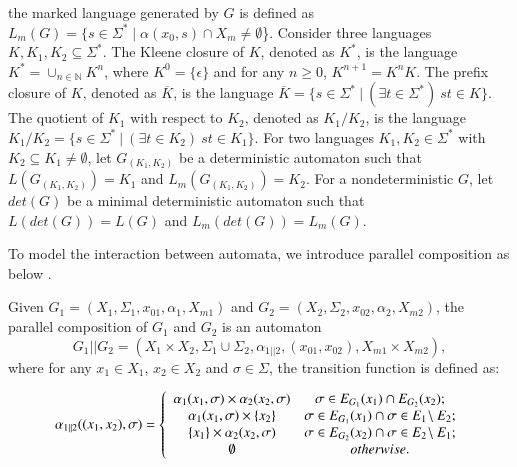 \documentclass[preprint,authoryear,12pt]{elsarticle}
\begin{document}
the marked language generated by $G$ is defined as $L_{m}(G)=\{s
\in \Sigma^{*} \mid \alpha(x_0, s) \cap X_m \neq \emptyset$\}.
Consider three languages $K, K_1, K_2 \subseteq \Sigma^{*}$. The
Kleene closure of $K$, denoted as $K^{*}$, is the language
$K^*=\cup_{n \in \mathbb{N}}K^{n}$, where $K^{0}=\{\epsilon\}$ and
for any $n \geq 0$, $K^{n+1}=K^{n}K$. The prefix closure of $K$,
denoted as $\overline{K}$, is the language $\overline{K}=\{s \in
\Sigma^{*}~|~(\exists t \in \Sigma^{*})~st\in K\}$. The quotient
of $K_1$ with respect to $K_2$, denoted as $K_1/K_2$, is the
language $K_1/K_2=\{s \in \Sigma^{*}~|~(\exists t \in K_2)~st \in
K_1\}$. For two languages $K_1, K_2 \in \Sigma^{*}$ with $K_2
\subseteq K_1 \neq \emptyset$, let $G_{(K_1, K_2)}$ be a
deterministic automaton such that $L(G_{(K_1, K_2)})=K_1$ and
$L_{m}(G_{(K_1, K_2)})=K_2$. For a nondeterministic $G$, let
$det(G)$ be a minimal deterministic automaton such that
$L(det(G))=L(G)$ and $L_{m}(det(G))=L_{m}(G)$.

To model the interaction between automata, we introduce parallel
composition as below \citep{cassandras2008introduction}.













\begin{Definition}\label{parallel}
Given $G_1 =(X_1,\Sigma_1,x_{01},\alpha_1, X_{m1})$ and $G_2
=(X_2,\Sigma_2,x_{02},\alpha_2,X_{m2})$, the parallel composition
of $G_1$ and $G_2$ is an automaton
\[
G_1 || G_2 = ( X_1 \times X_2, \Sigma_1 \cup \Sigma_2,
\alpha_{1||2}, (x_{01}, x_{02}), X_{m1} \times X_{m2}),
\]
where for any $x_1 \in X_1$, $x_2 \in X_2$ and $\sigma \in
\Sigma$, the transition function is defined as:

\[
\alpha_{1||2}((x_1, x_2),\sigma) = \left\{ {\begin{array}{*{20}c}
   \alpha_1(x_1, \sigma) \times \alpha_2(x_2, \sigma) & {\sigma \in E_{G_1}(x_1) \cap E_{G_2}(x_2) };  \\
   \alpha_1(x_1, \sigma) \times \{x_2\} & {\sigma \in E_{G_1}(x_1) \cap \sigma \in E_1 \!\setminus E_2};  \\
   \{x_1\} \times \alpha_2(x_2, \sigma) & {\sigma \in E_{G_2}(x_2) \cap \sigma \in E_2 \!\setminus E_1};  \\
\emptyset & {otherwise}.  \\
\end{array}} \right.
\]
\end{Definition}
\end{document}
